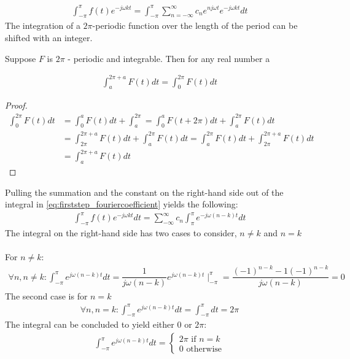 \begin{align} \label{eq:firststep_fouriercoefficient}
	\int_{-\pi}^\pi f(t)e^{-j\omega k t} = \int_{-\pi}^\pi \sum_{n=-\infty}^{\infty} c_n e^{n j\omega t} e^{-j\omega k t} dt
\end{align}
The integration of a $2\pi$-periodic function over the length of the period can be shifted with an integer.

\begin{lemma}\label{lemma:2pi-periodic_function}
Suppose $F$ is $2\pi$ - periodic and integrable. Then for any real number a 

\begin{align}
\int_a^{2\pi+a}F(t) dt = \int_0^{2\pi}F(t)dt
\end{align}
\end{lemma}
\begin{proof}
\begin{align*}
	\int_0^{2\pi}F(t)dt 
	&= \int_0^a F(t) dt + \int_a^{2\pi} 
	= \int_0^a F(t+2\pi)dt + \int_a^{2\pi} F(t) dt\\ 
	&= \int_{2\pi}^{2\pi + a} F(t) dt + \int_a^{2\pi}F(t)dt
	= \int_a^{2\pi}F(t)dt	+ \int_{2\pi}^{2\pi + a} F(t)dt \\
	&= \int_a^{2\pi+a}F(t)dt
\end{align*}
\end{proof}
Pulling the summation and the constant on the right-hand side out of the integral in \eqref{eq:firststep_fouriercoefficient} yields the following:
\begin{align*}
	\int_{-\pi}^\pi f(t) e^{-j \omega k t}dt
	= \sum_{-\infty}^\infty c_n \int_{\pi}^\pi e^{-j \omega(n-k)t}dt
\end{align*} 
The integral on the right-hand side has two cases to consider, $n \neq k$ and $n = k$\\\\
For $n\neq k$:
\begin{align*}
	\forall n,n\neq k: \int_{-\pi}^\pi e^{j\omega(n-k)t}dt 
	=\dfrac{1}{j\omega(n-k)}e^{j\omega(n-k)t}\mid_{-\pi}^{\pi}
	=\dfrac{(-1)^{n-k}-1(-1)^{n-k}}{j\omega(n-k)}
	=0
\end{align*}
The second case is for $n = k$
\begin{align*}
	\forall n,n=k: \int_{-\pi}^\pi e^{j\omega(n-k)t}dt = \int_{-\pi}^\pi dt = 2\pi
\end{align*}
The integral can be concluded to yield either $0$ or $2\pi$:
\begin{align}
	\int_{-\pi}^{\pi} e^{j \omega (n-k)t}dt 
	= 
	\begin{cases}
			2\pi \text{ if } n=k\\
			0 \text{ otherwise}
	\end{cases}
\end{align}
